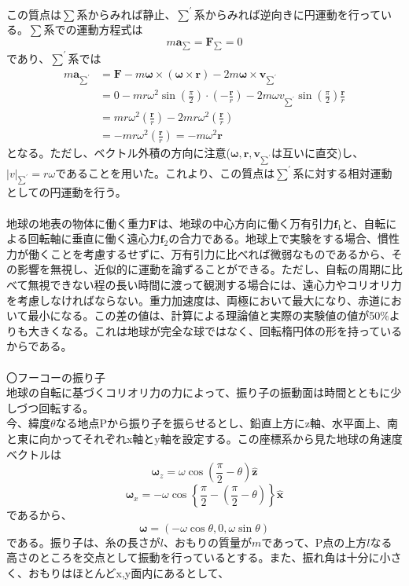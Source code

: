 \documentclass{jsarticle}
\begin{document}
この質点は\(\sum\)系からみれば静止、\(\sum^{\prime}\)系からみれば逆向きに円運動を行っている。\(\sum\)系での運動方程式は
\[m\bm{a}_{\sum}=\bm{F}_{\sum}=0\]
であり、\(\sum^{\prime}\)系では
\begin{align*}
m\bm{a}_{\sum^{\prime}}&=\bm{F}-m\bm{\omega}\times(\bm{\omega}\times\bm{r})-2m\bm{\omega}\times\bm{v}_{\sum^{\prime}}\\
&=0-mr\omega^{2}\sin\left(\frac{\pi}{2}\right)\cdot\left(-\frac{\bm{r}}{r}\right)-2m\omega v_{\sum^{\prime}}\sin\left(\frac{\pi}{2}\right)\frac{\bm{r}}{r}\\
&=mr\omega^{2}\left(\frac{\bm{r}}{r}\right)-2mr\omega^{2}\left(\frac{\bm{r}}{r}\right)\\
&=-mr\omega^{2}\left(\frac{\bm{r}}{r}\right)=-m\omega^2\bm{r}
\end{align*}
となる。ただし、ベクトル外積の方向に注意(\(\bm{\omega},\bm{r},\bm{v}_{\sum^{\prime}}\)は互いに直交)し、\(|v|_{\sum^{\prime}}=r\omega\)であることを用いた。これより、この質点は\(\sum^{\prime}\)系に対する相対運動としての円運動を行う。\\
\\
地球の地表の物体に働く重力\(\bm{F}\)は、地球の中心方向に働く万有引力\(\bm{f}_{1}\)と、自転による回転軸に垂直に働く遠心力\(\bm{f}_{2}\)の合力である。地球上で実験をする場合、慣性力が働くことを考慮するせずに、万有引力に比べれば微弱なものであるから、その影響を無視し、近似的に運動を論ずることができる。ただし、自転の周期に比べて無視できない程の長い時間に渡って観測する場合には、遠心力やコリオリ力を考慮しなければならない。重力加速度は、両極において最大になり、赤道において最小になる。この差の値は、計算による理論値と実際の実験値の値が50\(\%\)よりも大きくなる。これは地球が完全な球ではなく、回転楕円体の形を持っているからである。\\
\\
〇フーコーの振り子\\
地球の自転に基づくコリオリ力の力によって、振り子の振動面は時間とともに少しづつ回転する。\\
今、緯度\(\theta\)なる地点Pから振り子を振らせるとし、鉛直上方にz軸、水平面上、南と東に向かってそれぞれx軸とy軸を設定する。この座標系から見た地球の角速度ベクトルは
\[\bm{\omega}_{z}=\omega\cos\left(\frac{\pi}{2}-\theta\right)\hat{\bm{z}}\]
\[\bm{\omega}_{x}=-\omega\cos\left\{\frac{\pi}{2}-\left(\frac{\pi}{2}-\theta\right)\right\}\hat{\bm{x}}\]
であるから、
\[\bm{\omega}=(-\omega\cos\theta,0,\omega\sin\theta)\]
である。振り子は、糸の長さが\(l\)、おもりの質量が\(m\)であって、P点の上方\(l\)なる高さのところを交点として振動を行っているとする。また、振れ角は十分に小さく、おもりはほとんどx,y面内にあるとして、
\end{document}
